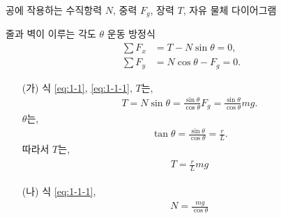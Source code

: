 \documentclass[floatfix,nofootinbib,superscriptaddress,fleqn]{revtex4-2}
\begin{document}
공에 작용하는 수직항력 $N$, 중력 $F_g$, 장력 $T$, 자유 물체 다이어그램
\begin{figure}[htbp]
  \centering
\end{figure} 

줄과 벽이 이루는 각도 $\theta$
운동 방정식
\begin{align}
  \label{eq:1-1}\sum F_x &= T-N\sin\theta =0, \\
  \label{eq:1-1-1}\sum F_y &= N\cos\theta -F_g =0.
\end{align}

\begin{itemize}
  \item[(가)] 식 \eqref{eq:1-1}, \eqref{eq:1-1-1}, $T$는,
  \begin{align}
    T = N\sin\theta=\frac{\sin\theta}{\cos\theta}F_g
    =\frac{\sin\theta}{\cos\theta}mg.
  \end{align}
$\theta$는,
\begin{align}
  \tan\theta = \frac{\sin\theta}{\cos\theta} = \frac{r}{L}.
\end{align}
따라서 $T$는,
\begin{align}
  \begin{split}
    T = \frac{r}{L}mg
  \end{split}
\end{align}

  \item[(나)]
  식 \eqref{eq:1-1-1},
  \begin{align}
    N =\frac{mg}{\cos\theta}
  \end{align}
\end{itemize}

\vspace{1.cm}
\end{document}

